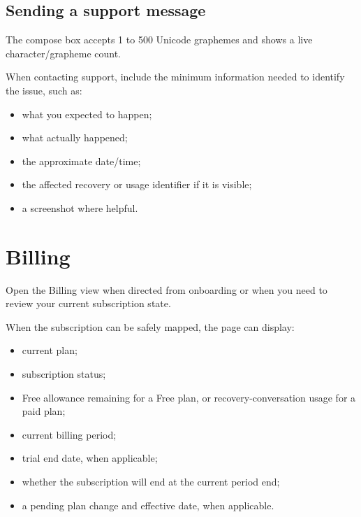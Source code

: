 
\section{Sending a support message}
The compose box accepts 1 to 500 Unicode graphemes and shows a live character/grapheme count.

When contacting support, include the minimum information needed to identify the issue, such as:
\begin{itemize}
  \item what you expected to happen;
  \item what actually happened;
  \item the approximate date/time;
  \item the affected recovery or usage identifier if it is visible;
  \item a screenshot where helpful.
\end{itemize}

\chapter{Billing}

Open the Billing view when directed from onboarding or when you need to review your current subscription state.


When the subscription can be safely mapped, the page can display:
\begin{itemize}
  \item current plan;
  \item subscription status;
  \item Free allowance remaining for a Free plan, or recovery-conversation usage for a paid plan;
  \item current billing period;
  \item trial end date, when applicable;
  \item whether the subscription will end at the current period end;
  \item a pending plan change and effective date, when applicable.
\end{itemize}

